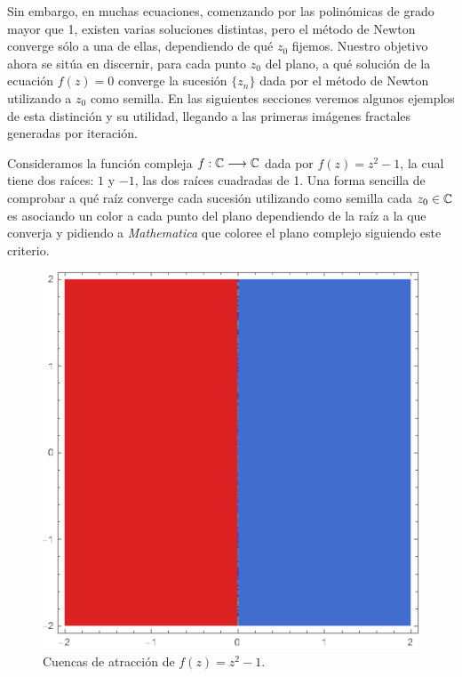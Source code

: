 Sin embargo, en muchas ecuaciones, comenzando por las polinómicas de grado mayor que 1, existen varias soluciones distintas, pero el método de Newton converge sólo a una de ellas, dependiendo de qué $z_0$ fijemos. Nuestro objetivo ahora se sitúa en discernir, para cada punto $z_0$ del plano, a qué solución de la ecuación $f(z)=0$ converge la sucesión $\{z_n\}$ dada por el método de Newton utilizando a $z_0$ como semilla. En las siguientes secciones veremos algunos ejemplos de esta distinción y su utilidad, llegando a las primeras imágenes fractales generadas por iteración.

\begin{ejemplo}
\label{ejemplo:cuencas-1}
Consideramos la función compleja $f:\mathbb{C}\longrightarrow\mathbb{C}$ dada por $f(z)=z^2-1$, la cual tiene dos raíces: $1$ y $-1$, las dos raíces cuadradas de 1. Una forma sencilla de comprobar a qué raíz converge cada sucesión utilizando como semilla cada $z_0\in\mathbb{C}$ es asociando un color a cada punto del plano dependiendo de la raíz a la que converja y pidiendo a \textit{Mathematica} que coloree el plano complejo siguiendo este criterio.


\begin{figure} [ht]
\centering
\includegraphics[scale = 0.4]{img/cuencas-1.png}
\caption{Cuencas de atracción de $f(z)=z^2-1$.}
    \label{fig:cuencas-1}
\end{figure}


\end{ejemplo}
